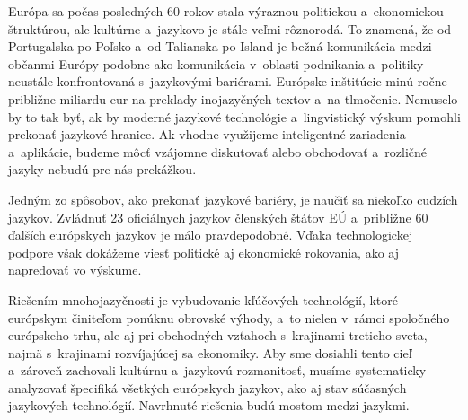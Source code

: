 \begin{multicols}{2}

  Európa sa počas posledných 60 rokov stala výraznou politickou
  a~ekonomickou štruktúrou, ale kultúrne a~jazykovo je stále
  veľmi rôznorodá. To znamená, že od Portugalska po Poľsko
  a~od Talianska po Island je bežná komunikácia medzi občanmi Európy podobne ako komunikácia v~oblasti podnikania a~politiky neustále konfrontovaná s~jazykovými bariérami. Európske inštitúcie minú ročne približne miliardu eur na preklady inojazyčných textov a~na tlmočenie. Nemuselo by to tak byť, ak by moderné jazykové technológie a~lingvistický výskum pomohli prekonať jazykové hranice. Ak vhodne využijeme inteligentné zariadenia a~aplikácie, budeme môcť vzájomne diskutovať alebo obchodovať a~rozličné jazyky nebudú pre nás prekážkou.


  Jedným zo spôsobov, ako prekonať jazykové bariéry, je naučiť sa
  niekoľko cudzích jazykov. Zvládnuť 23 oficiálnych jazykov
  členských štátov EÚ a~približne 60 ďalších európskych jazykov
  je málo pravdepodobné. Vďaka technologickej podpore však dokážeme
  viesť politické aj ekonomické rokovania, ako aj napredovať vo
  výskume.

  Riešením mnohojazyčnosti je vybudovanie kľúčových technológií,
  ktoré európskym činiteľom ponúknu obrovské výhody, a~to nielen
  v~rámci spoločného európskeho trhu, ale aj pri obchodných vzťahoch
  s~krajinami  tretieho sveta, najmä s~krajinami rozvíjajúcej sa
  ekonomiky. Aby sme dosiahli tento cieľ a~zároveň zachovali kultúrnu
  a~jazykovú rozmanitosť, musíme systematicky analyzovať špecifiká
  všetkých európskych jazykov, ako aj stav súčasných jazykových
  technológií. Navrhnuté riešenia budú mostom medzi jazykmi. 


\end{multicols}

\clearpage




